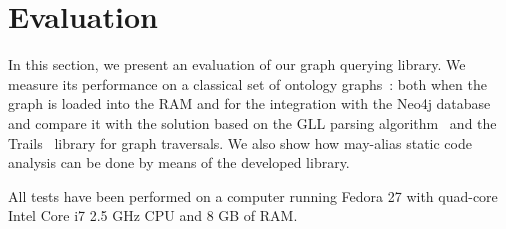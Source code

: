 \section{Evaluation}

In this section, we present an evaluation of our graph querying library.
We measure its performance on a classical set of ontology graphs~\cite{CFGonRDF}: both when the graph is loaded into the RAM and for the integration with the Neo4j database and compare it with the solution based on the GLL parsing algorithm~\cite{GrigorevR16} and the Trails~\cite{ScalaGraphParsing} library for graph traversals. We also show how may-alias static code analysis can be done by means of the developed library. 

All tests have been performed on a computer running Fedora 27 with quad-core Intel Core i7 2.5 GHz CPU and 8 GB of RAM.


